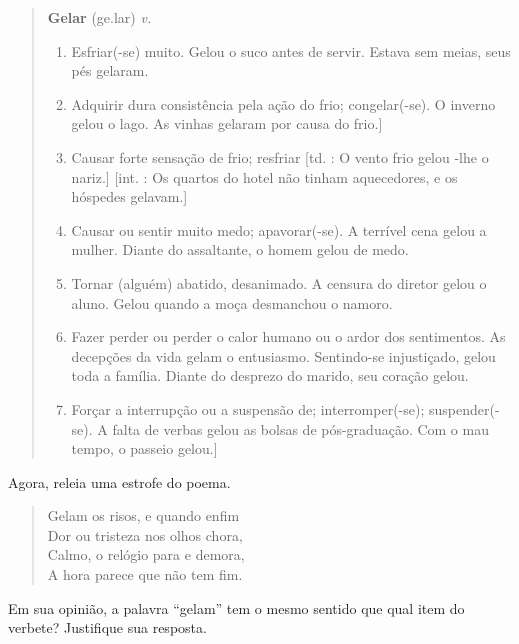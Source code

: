\begin{quote}
\textbf{Gelar} (ge.lar)
\textit{v.}

\begin{enumerate}
\item Esfriar(-se) muito.
Gelou o suco antes de servir.
Estava sem meias, seus pés gelaram.

\item Adquirir dura consistência pela ação do frio; congelar(-se).
O inverno gelou o lago.
As vinhas gelaram por causa do frio.]

\item Causar forte sensação de frio; resfriar [td. : O vento frio gelou -lhe o nariz.] [int. : Os quartos do hotel não tinham aquecedores, e os hóspedes gelavam.]

\item Causar ou sentir muito medo; apavorar(-se).
A terrível cena gelou a mulher.
Diante do assaltante, o homem gelou de medo.

\item Tornar (alguém) abatido, desanimado.
A censura do diretor gelou o aluno.
Gelou quando a moça desmanchou o namoro.

\item Fazer perder ou perder o calor humano ou o ardor dos sentimentos.
As decepções da vida gelam o entusiasmo.
Sentindo-se injustiçado, gelou toda a família.
Diante do desprezo do marido, seu coração gelou.

\item Forçar a interrupção ou a suspensão de; interromper(-se); suspender(-se).
A falta de verbas gelou as bolsas de pós-graduação.
Com o mau tempo, o passeio gelou.]
\end{enumerate}

\end{quote}

Agora, releia uma estrofe do poema.

\begin{verse}
Gelam os risos, e quando enfim\\
Dor ou tristeza nos olhos chora,\\
Calmo, o relógio para e demora,\\
A hora parece que não tem fim.
\end{verse}

Em sua opinião, a palavra ``gelam'' tem o mesmo sentido que qual item do verbete? Justifique sua resposta.

